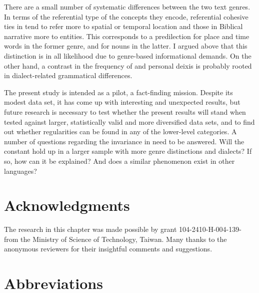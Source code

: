 \documentclass[output=paper
,modfonts
,nonflat]{langsci/langscibook}
\begin{document}
There are a small number of systematic differences between the two text genres. In terms of the referential type of the concepts they encode, referential cohesive ties in  tend to refer more to spatial or temporal location and those in Biblical narrative more to entities. This corresponds to a predilection for place and time words in the former genre, and for nouns in the latter. I argued above that this distinction is in all likelihood due to genre-based informational demands. On the other hand, a contrast in the frequency of  and personal deixis is probably rooted in dialect-related grammatical differences.

The present study is intended as a pilot, a fact-finding mission. Despite its modest data set, it has come up with interesting and unexpected results, but future research is necessary to test whether the present results will stand when tested against larger, statistically valid and more diversified data sets, and to find out whether regularities can be found in any of the lower-level categories. A number of questions regarding the invariance in  need to be answered. Will the  constant hold up in a larger sample with more genre distinctions and dialects? If so, how can it be explained? And does a similar phenomenon exist in other languages?

\section*{Acknowledgments}

The research in this chapter was made possible by grant 104-2410-H-004-139- from the Ministry of Science of Technology, Taiwan. Many thanks to the anonymous reviewers for their insightful comments and suggestions.

\section*{Abbreviations}
\end{document}
